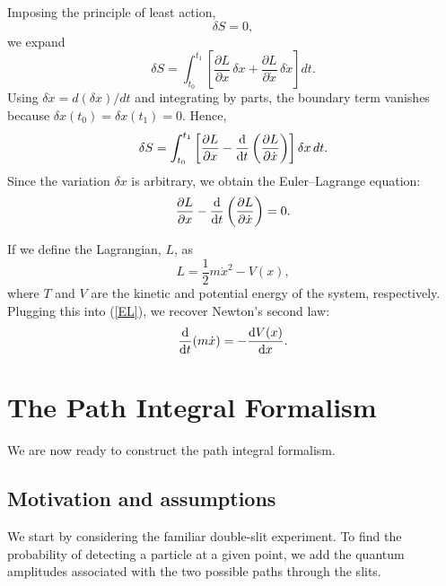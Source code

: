 \documentclass[12pt,a4paper]{article}
\begin{document}
Imposing the principle of least action,
\begin{equation}
    \delta S = 0,
    \label{PLA}
\end{equation}
we expand
\begin{equation}
    \delta S
    = \int_{t_0}^{t_1}
    \left[
        \frac{\partial L}{\partial x}\,\delta x
        +
        \frac{\partial L}{\partial \dot{x}}\, \delta \dot{x}
    \right] dt.
\end{equation}
Using $\delta\dot{x}=d(\delta x)/dt$ and integrating by parts, the boundary term vanishes because $\delta x(t_0)=\delta x(t_1)=0$. Hence,
\begin{equation}
    \delta S
    = \int_{t_0}^{t_1}
    \left[
        \frac{\partial L}{\partial x}
        -
        \dv{t}\left( \frac{\partial L}{\partial\dot{x}} \right)
    \right] \delta x \, dt.
\end{equation}
Since the variation $\delta x$ is arbitrary, we obtain the Euler–Lagrange equation:
\begin{equation}
    \frac{\partial L}{\partial x}
    -
    \dv{t}\left( \frac{\partial L}{\partial\dot{x}} \right)
    = 0.
    \label{EL}
\end{equation}

If we define the Lagrangian, $L$, as
\begin{equation}
    L = \frac{1}{2}m\dot{x}^2- V(x),
\end{equation}
where $T$ and $V$ are the kinetic and potential energy of the system, respectively. Plugging this into (\ref{EL}), we recover Newton's second law:
\begin{equation}
    \dv{t}(m\dot{x}) = -\dv{V(x)}{x}.
\end{equation}

\section{The Path Integral Formalism}
We are now ready to construct the path integral formalism.

\subsection{Motivation and assumptions}
We start by considering the familiar double-slit experiment. To find the probability of detecting a particle at a given point, we add the quantum amplitudes associated with the two possible paths through the slits.
\end{document}
